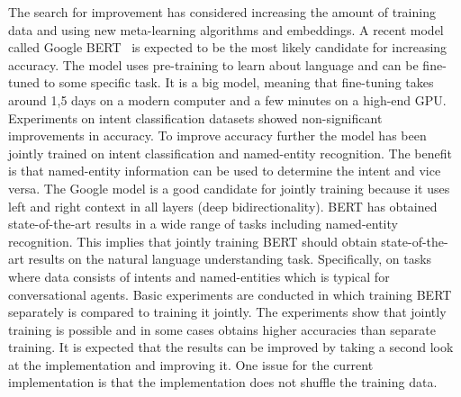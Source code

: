 The search for improvement has considered increasing the amount of training data and using new meta-learning algorithms and embeddings.
A recent model called Google BERT~\citep{devlin2018} is expected to be the most likely candidate for increasing accuracy.
The model uses pre-training to learn about language and can be fine-tuned to some specific task.
It is a big model, meaning that fine-tuning takes around 1,5 days on a modern computer and a few minutes on a high-end GPU.
Experiments on intent classification datasets showed non-significant improvements in accuracy.
To improve accuracy further the model has been jointly trained on intent classification and named-entity recognition.
The benefit is that named-entity information can be used to determine the intent and vice versa.
The Google model is a good candidate for jointly training because it uses left and right context in all layers (deep bidirectionality).
BERT has obtained state-of-the-art results in a wide range of tasks including named-entity recognition.
This implies that jointly training BERT should obtain state-of-the-art results on the natural language understanding task.
Specifically, on tasks where data consists of intents and named-entities which is typical for conversational agents.
Basic experiments are conducted in which training BERT separately is compared to training it jointly.
The experiments show that jointly training is possible and in some cases obtains higher accuracies than separate training.
It is expected that the results can be improved by taking a second look at the implementation and improving it.
One issue for the current implementation is that the implementation does not shuffle the training data.

\iffalse
In general the NLP field is in an interesting state.
Technology companies have a lot of incentive to push the field forward.
Leaps in the last few years have come from those companies.
For example, FastText by Facebook and transformer models by Google.
A second observation is that state-of-the-art scores are increased every few months.
This results in papers which are quickly pushed to arXiv and cited before any scholarly peer review.
\fi


